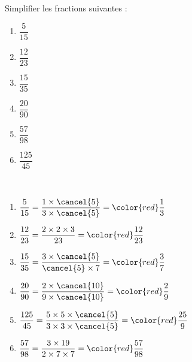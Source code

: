 \begin{exercice*}
   Simplifier les fractions suivantes : \smallskip
   \begin{multicols}{3}
      \begin{enumerate}
         \item $\dfrac{5}{15}$ \medskip
         \item $\dfrac{12}{23}$ \medskip
         \item $\dfrac{15}{35}$ \medskip
         \item $\dfrac{20}{90}$ \medskip
         \item $\dfrac{57}{98}$ \medskip
         \item $\dfrac{125}{45}$      
      \end{enumerate}
   \end{multicols}
\end{exercice*}
\begin{corrige}
   \ \\ [-5mm]
      \begin{multicols}{2}
      \begin{enumerate}
      \item $\dfrac{5}{15} =\dfrac{1\times\cancel{5}}{3\times\cancel{5}} ={\color{red} \dfrac13}$ \medskip
      \item $\dfrac{12}{23} =\dfrac{2\times2\times3}{23} ={\color{red} \dfrac{12}{23}}$ \medskip
      \item $\dfrac{15}{35} =\dfrac{3\times\cancel{5}}{\cancel{5}\times7} ={\color{red} \dfrac37}$ \medskip
      \item $\dfrac{20}{90} =\dfrac{2\times\cancel{10}}{9\times\cancel{10}} ={\color{red} \dfrac29}$ \medskip
      \item $\dfrac{125}{45} =\dfrac{5\times5\times\cancel{5}}{3\times3\times\cancel{5}} ={\color{red} \dfrac{25}{9}}$ \medskip
      \item $\dfrac{57}{98} =\dfrac{3\times19}{2\times7\times7} ={\color{red} \dfrac{57}{98}}$
         \end{enumerate}
   \end{multicols}
\end{corrige}
